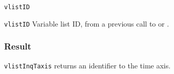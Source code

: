 \hspace*{4mm}\begin{minipage}[]{15cm}
\begin{deflist}{\texttt{vlistID}\ }
\item[\texttt{vlistID}]
Variable list ID, from a previous call to {} or {}.

\end{deflist}
\end{minipage}

\subsubsection*{Result}

{\texttt{vlistInqTaxis}} returns an identifier to the time axis.

